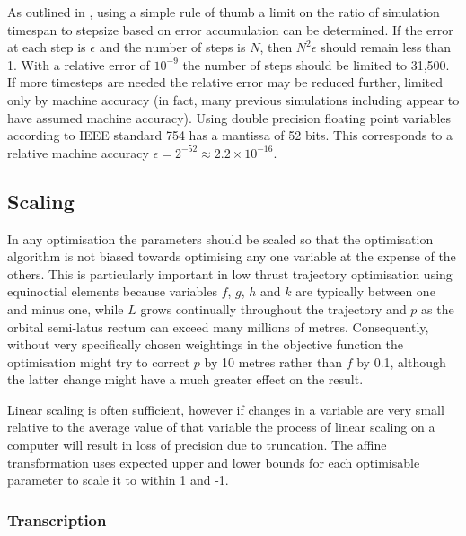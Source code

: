 As outlined in \textcite{Milani1987}, using a simple rule of thumb a limit on the ratio of simulation timespan to stepsize based on error accumulation can be determined. If the error at each step is $\epsilon$ and the number of steps is $N$, then $N^{2}\epsilon$ should remain less than 1. With a relative error of $10^{-9}$ the number of steps should be limited to 31,500. If more timesteps are needed the relative error may be reduced further, limited only by machine accuracy (in fact, many previous simulations including \citeauthor{Milani1987} appear to have assumed machine accuracy). Using double precision floating point variables according to IEEE standard 754 has a mantissa of 52 bits. This corresponds to a relative machine accuracy $\epsilon=2^{-52}\approx2.2\times10^{-16}$.

\subsection{Scaling} \label{sub:Scaling}

In any optimisation the parameters should be scaled so that the optimisation algorithm is not biased towards optimising any one variable at the expense of the others. This is particularly important in low thrust trajectory optimisation using equinoctial elements because variables $f$, $g$, $h$ and $k$ are typically between one and minus one, while $L$ grows continually throughout the trajectory and $p$ as the orbital semi-latus rectum can exceed many millions of metres. Consequently, without very specifically chosen weightings in the objective function the optimisation might try to correct $p$ by 10 metres rather than $f$ by 0.1, although the latter change might have a much greater effect on the result.

Linear scaling is often sufficient, however if changes in a variable are very small relative to the average value of that variable the process of linear scaling on a computer will result in loss of precision due to truncation. The affine transformation \parencite{ASTOS_guide} uses expected upper and lower bounds for each optimisable parameter to scale it to within 1 and -1.

 

\subsubsection{Transcription}

